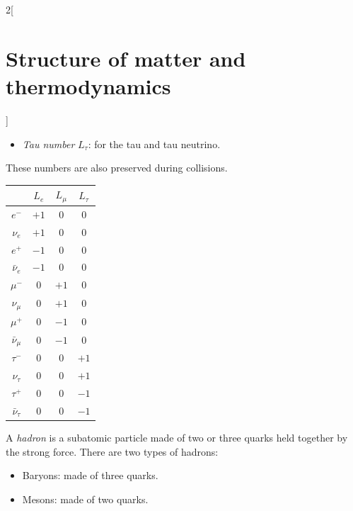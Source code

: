 \documentclass[../../../main.tex]{subfiles}
\begin{document}
\begin{multicols}{2}[\section{Structure of matter and thermodynamics}]
\begin{definition}
\begin{itemize}
      \item \emph{Tau number} $L_\tau$: for the tau and tau neutrino.
    \end{itemize}
    These numbers are also preserved during collisions.
    \begin{center}
      \begin{minipage}{\linewidth}
        \centering
        \begin{tabular}{cccc}
                           & $L_e$ & $L_\mu$ & $L_\tau$ \\
          \hline
          $e^-$            & $+1$  & 0       & 0        \\
          $\nu_e$          & $+1$  & 0       & 0        \\
          $e^+$            & $-1$  & 0       & 0        \\
          $\bar{\nu}_e$    & $-1$  & 0       & 0        \\
          $\mu^-$          & 0     & $+1$    & 0        \\
          $\nu_\mu$        & 0     & $+1$    & 0        \\
          $\mu^+$          & 0     & $-1$    & 0        \\
          $\bar{\nu}_\mu$  & 0     & $-1$    & 0        \\
          $\tau^-$         & 0     & 0       & $+1$     \\
          $\nu_\tau$       & 0     & 0       & $+1$     \\
          $\tau^+$         & 0     & 0       & $-1$     \\
          $\bar{\nu}_\tau$ & 0     & 0       & $-1$     \\
        \end{tabular}
      \end{minipage}
    \end{center}
  \end{definition}
  \begin{definition}[Hadron]
    A \emph{hadron} is a subatomic particle made of two or three quarks held together by the strong force. There are two types of hadrons:
    \begin{itemize}
      \item Baryons: made of three quarks.
      \item Mesons: made of two quarks.
    \end{itemize}
  \end{definition}
  \begin{definition}\label{SMT_color}

\end{definition}
\end{multicols}
\end{document}
